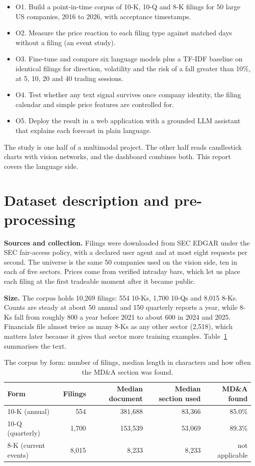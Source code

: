 \documentclass[11pt,a4paper]{article}
\begin{document}
\begin{itemize}
\item O1. Build a point-in-time corpus of 10-K, 10-Q and 8-K filings for 50 large US companies, 2016 to 2026, with acceptance timestamps.
\item O2. Measure the price reaction to each filing type against matched days without a filing (an event study).
\item O3. Fine-tune and compare six language models plus a TF-IDF baseline on identical filings for direction, volatility and the risk of a fall greater than 10\%, at 5, 10, 20 and 40 trading sessions.
\item O4. Test whether any text signal survives once company identity, the filing calendar and simple price features are controlled for.
\item O5. Deploy the result in a web application with a grounded LLM assistant that explains each forecast in plain language.
\end{itemize}

The study is one half of a multimodal project. The other half reads candlestick charts with vision networks, and the dashboard combines both. This report covers the language side.

\section{Dataset description and pre-processing}

\textbf{Sources and collection.} Filings were downloaded from SEC EDGAR under the SEC fair-access policy, with a declared user agent and at most eight requests per second. The universe is the same 50 companies used on the vision side, ten in each of five sectors. Prices come from verified intraday bars, which let us place each filing at the first tradeable moment after it became public.

\textbf{Size.} The corpus holds 10,269 filings: 554 10-Ks, 1,700 10-Qs and 8,015 8-Ks. Counts are steady at about 50 annual and 150 quarterly reports a year, while 8-Ks fall from roughly 800 a year before 2021 to about 600 in 2024 and 2025. Financials file almost twice as many 8-Ks as any other sector (2,518), which matters later because it gives that sector more training examples. Table~\ref{tab:corpus} summarises the text.

\begin{table}[h]
\centering
\caption{The corpus by form: number of filings, median length in characters and how often the MD\&A section was found.}
\label{tab:corpus}
\begin{tabular}{lrrrr}
\toprule
Form & Filings & Median document & Median section used & MD\&A found \\
\midrule
10-K (annual) & 554 & 381,688 & 83,366 & 85.0\% \\
10-Q (quarterly) & 1,700 & 153,539 & 53,069 & 89.3\% \\
8-K (current events) & 8,015 & 8,233 & 8,233 & not applicable \\
\bottomrule
\end{tabular}
\end{table}
\end{document}
